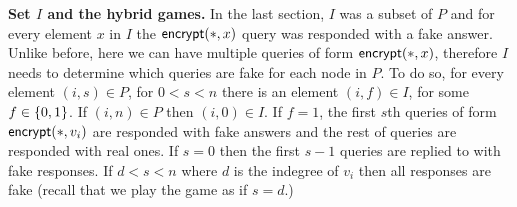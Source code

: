 \documentclass{article}
\newcommand{\encrypt}{{\sf encrypt}}
\newcommand{\T}{{\mathsf T}}
\newcommand{\lastup}{{\mathsf {LastUp}}}
\newcommand{\lastdown}{{\mathsf {LastDown}}}
\newcommand{\bigv}[1]{\mbox{\large $v_{#1}$}}
\newcommand{\bigw}{\mbox{\large $w$}}
\begin{document}
  \textbf{Set $I$ and the hybrid games.} In the last section, $I$ was a subset of $P$ and for every element $x$ in $I$ the $\encrypt(*,x)$ query was responded with a fake answer. Unlike before, here we can have multiple queries of form $\encrypt(*,x)$, therefore $I$ needs to determine which queries are fake for each node in $P$. To do so, for every element $(i,s)\in P$, for $0<s<n$ there is an element $(i,f)\in I$, for some $f\in\{0,1\}$. If $(i,n)\in P$ then $(i,0)\in I$. If $f=1$, the first $s$th queries of form $\encrypt(*,v_i)$ are responded with fake answers and the rest of queries are responded with real ones. If $s=0$ then the first $s-1$ queries are replied to with fake responses. If $d<s<n$ where $d$ is the indegree of $v_i$ then all responses are fake (recall that we play the game as if $s=d$.)
  
\end{document}
